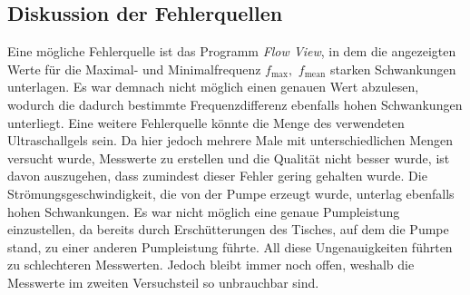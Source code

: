 \subsection{Diskussion der Fehlerquellen}
\label{subsec:diskFehler}
Eine mögliche Fehlerquelle ist das Programm \textit{Flow View}, in dem die angezeigten Werte für die Maximal- und Minimalfrequenz $f_{\text{max}},\, \,f_{\text{mean}}$
starken Schwankungen unterlagen. Es war demnach nicht möglich einen genauen Wert abzulesen, wodurch die dadurch bestimmte Frequenzdifferenz ebenfalls
hohen Schwankungen unterliegt.
Eine weitere Fehlerquelle könnte die Menge des verwendeten Ultraschallgels sein. Da hier jedoch mehrere Male mit unterschiedlichen Mengen versucht wurde, Messwerte
zu erstellen und die Qualität nicht besser wurde, ist davon auszugehen, dass zumindest dieser Fehler gering gehalten wurde.
Die Strömungsgeschwindigkeit, die von der Pumpe erzeugt wurde, unterlag ebenfalls hohen Schwankungen. Es war nicht möglich eine genaue Pumpleistung
einzustellen, da bereits durch Erschütterungen des Tisches, auf dem die Pumpe stand, zu einer anderen Pumpleistung führte.
All diese Ungenauigkeiten führten zu schlechteren Messwerten. Jedoch bleibt immer noch offen, weshalb die Messwerte im zweiten Versuchsteil so unbrauchbar sind.

\printbibliography{}


